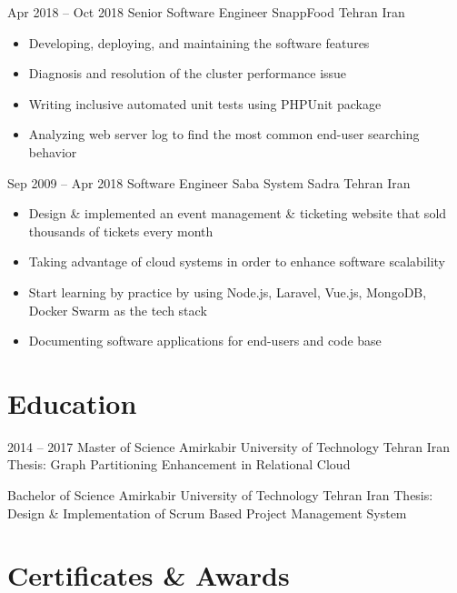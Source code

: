 \documentclass[11pt, a4paper, sans]{moderncv}
\begin{document}
    \cventry
    {Apr 2018 -- Oct 2018}
    {Senior Software Engineer}
    {SnappFood}
    {Tehran}
    {Iran}
    {
        \begin{itemize}
            \item Developing, deploying, and maintaining the software features
            \item Diagnosis and resolution of the cluster performance issue
            \item Writing inclusive automated unit tests using PHPUnit package
            \item Analyzing web server log to find the most common end-user searching behavior
        \end{itemize}
    }

    \cventry
    {Sep 2009 -- Apr 2018}
    {Software Engineer}
    {Saba System Sadra}
    {Tehran}
    {Iran}
    {
        \begin{itemize}
            \item Design \& implemented an event management \& ticketing website that sold thousands of tickets every month
            \item Taking advantage of cloud systems in order to enhance software scalability
            \item Start learning by practice by using Node.js, Laravel, Vue.js, MongoDB, Docker Swarm as the tech stack
            \item Documenting software applications for end-users and code base
        \end{itemize}
    }


    \section{Education}\label{sec:education}

    \cventry
    {2014 -- 2017}
    {Master of Science}
    {Amirkabir University of Technology}
    {Tehran}
    {Iran}
    {Thesis: Graph Partitioning Enhancement in Relational Cloud}

    {Bachelor of Science}
    {Amirkabir University of Technology}
    {Tehran}
    {Iran}
    {Thesis: Design \& Implementation of Scrum Based Project Management System}


    \section{Certificates \& Awards}\label{sec:certificates-&-awards}

\end{document}

